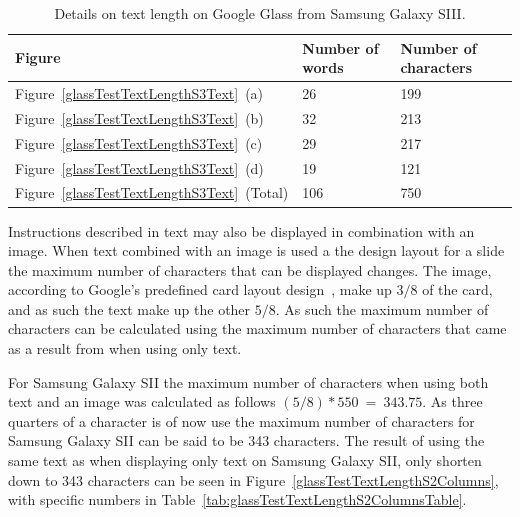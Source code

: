 	\begin{table}[ht!]
    		\caption{Details on text length on Google Glass from Samsung Galaxy SIII.} \label{tab:glassTestTextLengthS3TextTable}
		\centering \begin{tabularx}{\textwidth}{l|X|X} \hline
		\textbf{Figure} & \textbf{Number of words} & \textbf{Number of characters} \\ \hline \hline
       
		Figure~\ref{glassTestTextLengthS3Text}~(a)	&26	&199	\\ \hline
		Figure~\ref{glassTestTextLengthS3Text}~(b)	&32	&213	\\ \hline
		Figure~\ref{glassTestTextLengthS3Text}~(c)	&29	&217	\\ \hline
		Figure~\ref{glassTestTextLengthS3Text}~(d)	&19	&121	\\ \hline
		Figure~\ref{glassTestTextLengthS3Text}~(Total)	&106	&750	\\ \hline
		
		\end{tabularx}
	\end{table}

Instructions described in text may also be displayed in combination with an image. When text combined with an image is used a the design layout for a slide the maximum number of characters that can be displayed changes. The image, according to Google's predefined card layout design~\cite{glassDesignStyle}, make up \(3/8\) of the card, and as such the text make up the other \(5/8\). As such the maximum number of characters can be calculated using the maximum number of characters that came as a result from when using only text.

For Samsung Galaxy SII the maximum number of characters when using both text and an image was calculated as follows \((5/8)*550~=~343.75\). As three quarters of a character is of now use the maximum number of characters for Samsung Galaxy SII can be said to be 343 characters. The result of using the same text as when displaying only text on Samsung Galaxy SII, only shorten down to 343 characters can be seen in Figure~\ref{glassTestTextLengthS2Columns}, with specific numbers in Table~\ref{tab:glassTestTextLengthS2ColumnsTable}.

